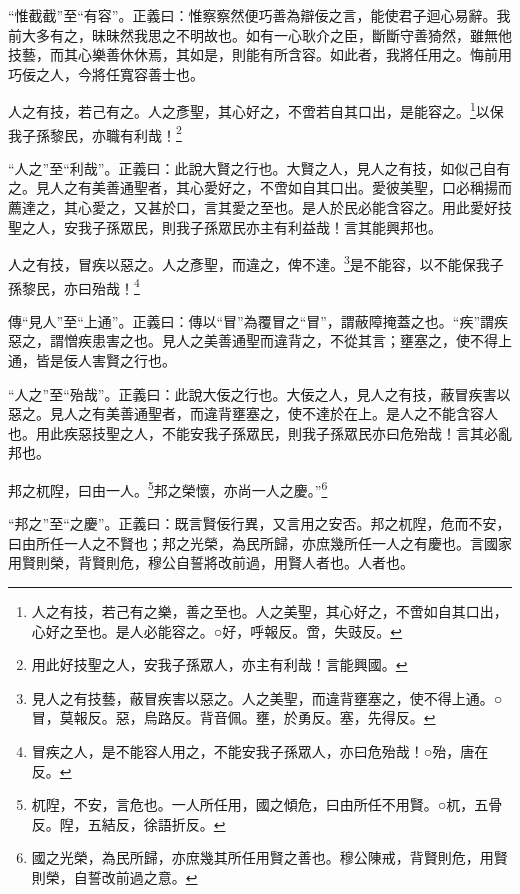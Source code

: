 {\noindent\shu{}\fzkt “惟截截”至“有容”。正義曰：惟察察然便巧善為辯佞之言，能使君子迴心易辭。我前大多有之，昧昧然我思之不明故也。如有一心耿介之臣，斷斷守善猗然，雖無他技藝，而其心樂善休休焉，其如是，則能有所含容。如此者，我將任用之。悔前用巧佞之人，今將任寬容善士也。 \par}

人之有技，若己有之。人之彥聖，其心好之，不啻若自其口出，是能容之。\footnote{人之有技，若己有之樂，善之至也。人之美聖，其心好之，不啻如自其口出，心好之至也。是人必能容之。○好，呼報反。啻，失豉反。}以保我子孫黎民，亦職有利哉！\footnote{用此好技聖之人，安我子孫眾人，亦主有利哉！言能興國。}

{\noindent\shu{}\fzkt “人之”至“利哉”。正義曰：此說大賢之行也。大賢之人，見人之有技，如似己自有之。見人之有美善通聖者，其心愛好之，不啻如自其口出。愛彼美聖，口必稱揚而薦達之，其心愛之，又甚於口，言其愛之至也。是人於民必能含容之。用此愛好技聖之人，安我子孫眾民，則我子孫眾民亦主有利益哉！言其能興邦也。 \par}

人之有技，冒疾以惡之。人之彥聖，而違之，俾不達。\footnote{見人之有技藝，蔽冒疾害以惡之。人之美聖，而違背壅塞之，使不得上通。○冒，莫報反。惡，烏路反。背音佩。壅，於勇反。塞，先得反。}是不能容，以不能保我子孫黎民，亦曰殆哉！\footnote{冒疾之人，是不能容人用之，不能安我子孫眾人，亦曰危殆哉！○殆，唐在反。}


{\noindent\zhuan{}\fzbyks 傳“見人”至“上通”。正義曰：傳以“冒”為覆冒之“冒”，謂蔽障掩蓋之也。“疾”謂疾惡之，謂憎疾患害之也。見人之美善通聖而違背之，不從其言；壅塞之，使不得上通，皆是佞人害賢之行也。 \par}

{\noindent\shu{}\fzkt “人之”至“殆哉”。正義曰：此說大佞之行也。大佞之人，見人之有技，蔽冒疾害以惡之。見人之有美善通聖者，而違背壅塞之，使不達於在上。是人之不能含容人也。用此疾惡技聖之人，不能安我子孫眾民，則我子孫眾民亦曰危殆哉！言其必亂邦也。 \par}

邦之杌隉，曰由一人。\footnote{杌隉，不安，言危也。一人所任用，國之傾危，曰由所任不用賢。○杌，五骨反。隉，五結反，徐語折反。}邦之榮懷，亦尚一人之慶。”\footnote{國之光榮，為民所歸，亦庶幾其所任用賢之善也。穆公陳戒，背賢則危，用賢則榮，自誓改前過之意。}

{\noindent\shu{}\fzkt “邦之”至“之慶”。正義曰：既言賢佞行異，又言用之安否。邦之杌隉，危而不安，曰由所任一人之不賢也；邦之光榮，為民所歸，亦庶幾所任一人之有慶也。言國家用賢則榮，背賢則危，穆公自誓將改前過，用賢人者也。人者也。 \par}

